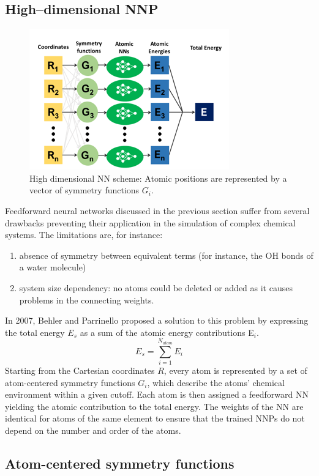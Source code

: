 \documentclass[12pt]{article}
\begin{document}
\subsection{High--dimensional NNP}
\begin{figure}[!htp]
    \centering
    \includegraphics[scale=1.0]{latex_files/BP_NN.png}
    \caption{High dimensional NN scheme: Atomic positions are represented by a vector of symmetry functions $G_i$. }
    \label{High-dimensional-NNP_scheme}
\end{figure}
Feedforward neural networks discussed in the previous section suffer from several drawbacks preventing their application in the simulation of complex chemical systems. The limitations are, for instance:
\begin{enumerate}
    \item absence of symmetry between equivalent terms (for instance, the OH bonds of a water molecule)
    \item system size dependency: no atoms could be deleted or added as it causes problems in the connecting weights.
\end{enumerate}
In 2007, Behler and Parrinello proposed a solution to this problem by expressing the total energy $E_s$ as a sum of the atomic energy contributions E$_i$.\cite{Behler2007}
\begin{equation}
    E_s = \sum_{i=1}^{N_{atom}} E_i
\end{equation}
Starting from the Cartesian coordinates $R$, every atom is represented by a set of atom-centered symmetry functions $G_i$, which describe the atoms' chemical environment within a given cutoff. Each atom is then assigned a feedforward NN yielding the atomic contribution to the total energy. The weights of the NN are identical for atoms of the same element to ensure that the trained NNPs do not depend on the number and order of the atoms.

\subsection{Atom-centered symmetry functions}
\end{document}
